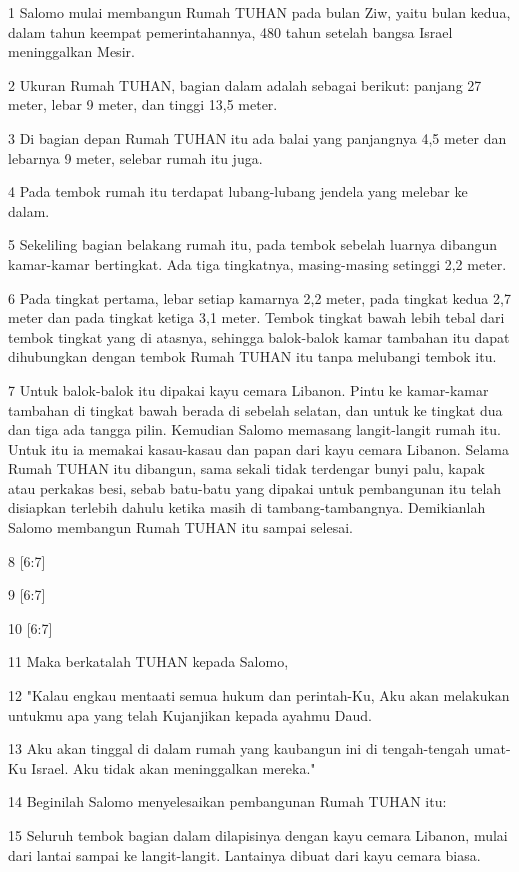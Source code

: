 \par 1 Salomo mulai membangun Rumah TUHAN pada bulan Ziw, yaitu bulan kedua, dalam tahun keempat pemerintahannya, 480 tahun setelah bangsa Israel meninggalkan Mesir.
\par 2 Ukuran Rumah TUHAN, bagian dalam adalah sebagai berikut: panjang 27 meter, lebar 9 meter, dan tinggi 13,5 meter.
\par 3 Di bagian depan Rumah TUHAN itu ada balai yang panjangnya 4,5 meter dan lebarnya 9 meter, selebar rumah itu juga.
\par 4 Pada tembok rumah itu terdapat lubang-lubang jendela yang melebar ke dalam.
\par 5 Sekeliling bagian belakang rumah itu, pada tembok sebelah luarnya dibangun kamar-kamar bertingkat. Ada tiga tingkatnya, masing-masing setinggi 2,2 meter.
\par 6 Pada tingkat pertama, lebar setiap kamarnya 2,2 meter, pada tingkat kedua 2,7 meter dan pada tingkat ketiga 3,1 meter. Tembok tingkat bawah lebih tebal dari tembok tingkat yang di atasnya, sehingga balok-balok kamar tambahan itu dapat dihubungkan dengan tembok Rumah TUHAN itu tanpa melubangi tembok itu.
\par 7 Untuk balok-balok itu dipakai kayu cemara Libanon. Pintu ke kamar-kamar tambahan di tingkat bawah berada di sebelah selatan, dan untuk ke tingkat dua dan tiga ada tangga pilin. Kemudian Salomo memasang langit-langit rumah itu. Untuk itu ia memakai kasau-kasau dan papan dari kayu cemara Libanon. Selama Rumah TUHAN itu dibangun, sama sekali tidak terdengar bunyi palu, kapak atau perkakas besi, sebab batu-batu yang dipakai untuk pembangunan itu telah disiapkan terlebih dahulu ketika masih di tambang-tambangnya. Demikianlah Salomo membangun Rumah TUHAN itu sampai selesai.
\par 8 [6:7]
\par 9 [6:7]
\par 10 [6:7]
\par 11 Maka berkatalah TUHAN kepada Salomo,
\par 12 "Kalau engkau mentaati semua hukum dan perintah-Ku, Aku akan melakukan untukmu apa yang telah Kujanjikan kepada ayahmu Daud.
\par 13 Aku akan tinggal di dalam rumah yang kaubangun ini di tengah-tengah umat-Ku Israel. Aku tidak akan meninggalkan mereka."
\par 14 Beginilah Salomo menyelesaikan pembangunan Rumah TUHAN itu:
\par 15 Seluruh tembok bagian dalam dilapisinya dengan kayu cemara Libanon, mulai dari lantai sampai ke langit-langit. Lantainya dibuat dari kayu cemara biasa.
